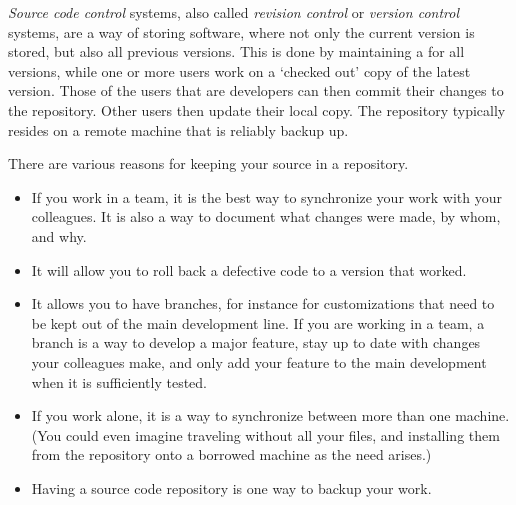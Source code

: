 
\emph{Source code control} systems, also
called \emph{revision control}  or
\emph{version control}
systems, are
a way of storing software, where not only the current version is
stored, but also all previous versions. 
This is done by maintaining a  for all versions,
while one or more users work on a `checked out' copy of the latest
version. Those of the users that are developers can then commit their
changes to the repository. Other users then update their local copy.
The repository typically resides on a remote machine that is reliably
backup up.

There are various reasons for keeping your source in a repository.
\begin{itemize}
\item If you work in a team, it is the best way to synchronize your
  work with your colleagues. It is also a way to document what changes
  were made, by whom, and why.
\item It will allow you to roll back a defective code to a version
  that worked.
\item It allows you to have branches, for instance for customizations
  that need to be kept out of the main development line. If you are
  working in a team, a branch is a way to develop a major feature, stay up
  to date with changes your colleagues make, and only add your feature
  to the main development when it is sufficiently tested.
\item If you work alone, it is a way to synchronize between more than
  one machine. (You could even imagine traveling without all your
  files, and installing them from the repository onto a borrowed
  machine as the need arises.)
\item Having a source code repository is one way to backup your work.
\end{itemize}

